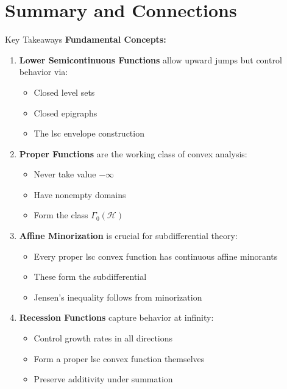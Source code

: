 \documentclass[aspectratio=169,10pt]{beamer}
\begin{document}
\section{Summary and Connections}

\begin{frame}[allowframebreaks]{Key Takeaways}
\textbf{Fundamental Concepts:}

\begin{enumerate}
    \item \textbf{Lower Semicontinuous Functions} allow upward jumps but control behavior via:
        \begin{itemize}
            \item Closed level sets
            \item Closed epigraphs
            \item The lsc envelope construction
        \end{itemize}

    \item \textbf{Proper Functions} are the working class of convex analysis:
        \begin{itemize}
            \item Never take value $-\infty$
            \item Have nonempty domains
            \item Form the class $\Gamma_0(\mathcal{H})$
        \end{itemize}

    \item \textbf{Affine Minorization} is crucial for subdifferential theory:
        \begin{itemize}
            \item Every proper lsc convex function has continuous affine minorants
            \item These form the subdifferential
            \item Jensen's inequality follows from minorization
        \end{itemize}

    \item \textbf{Recession Functions} capture behavior at infinity:
        \begin{itemize}
            \item Control growth rates in all directions
            \item Form a proper lsc convex function themselves
            \item Preserve additivity under summation
        \end{itemize}


\end{enumerate}
\end{frame}
\end{document}
